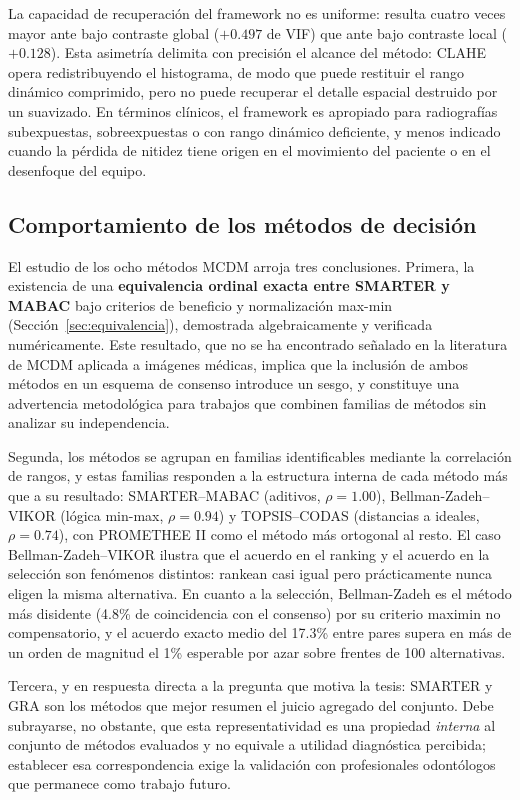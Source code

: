 La capacidad de recuperación del framework no es uniforme: resulta cuatro veces mayor ante bajo contraste global ($+0.497$ de VIF) que ante bajo contraste local ($+0.128$). Esta asimetría delimita con precisión el alcance del método: CLAHE opera redistribuyendo el histograma, de modo que puede restituir el rango dinámico comprimido, pero no puede recuperar el detalle espacial destruido por un suavizado. En términos clínicos, el framework es apropiado para radiografías subexpuestas, sobreexpuestas o con rango dinámico deficiente, y menos indicado cuando la pérdida de nitidez tiene origen en el movimiento del paciente o en el desenfoque del equipo.

\subsection{Comportamiento de los métodos de decisión}

El estudio de los ocho métodos MCDM arroja tres conclusiones. Primera, la existencia de una \textbf{equivalencia ordinal exacta entre SMARTER y MABAC} bajo criterios de beneficio y normalización max-min (Sección~\ref{sec:equivalencia}), demostrada algebraicamente y verificada numéricamente. Este resultado, que no se ha encontrado señalado en la literatura de MCDM aplicada a imágenes médicas, implica que la inclusión de ambos métodos en un esquema de consenso introduce un sesgo, y constituye una advertencia metodológica para trabajos que combinen familias de métodos sin analizar su independencia.

Segunda, los métodos se agrupan en familias identificables mediante la correlación de rangos, y estas familias responden a la estructura interna de cada método más que a su resultado: SMARTER--MABAC (aditivos, $\rho = 1.00$), Bellman-Zadeh--VIKOR (lógica min-max, $\rho = 0.94$) y TOPSIS--CODAS (distancias a ideales, $\rho = 0.74$), con PROMETHEE II como el método más ortogonal al resto. El caso Bellman-Zadeh--VIKOR ilustra que el acuerdo en el ranking y el acuerdo en la selección son fenómenos distintos: rankean casi igual pero prácticamente nunca eligen la misma alternativa. En cuanto a la selección, Bellman-Zadeh es el método más disidente (4.8\% de coincidencia con el consenso) por su criterio maximin no compensatorio, y el acuerdo exacto medio del 17.3\% entre pares supera en más de un orden de magnitud el 1\% esperable por azar sobre frentes de 100 alternativas.

Tercera, y en respuesta directa a la pregunta que motiva la tesis: SMARTER y GRA son los métodos que mejor resumen el juicio agregado del conjunto. Debe subrayarse, no obstante, que esta representatividad es una propiedad \textit{interna} al conjunto de métodos evaluados y no equivale a utilidad diagnóstica percibida; establecer esa correspondencia exige la validación con profesionales odontólogos que permanece como trabajo futuro.

